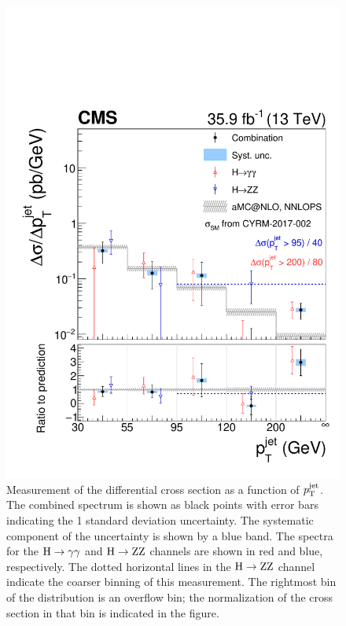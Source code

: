 \begin{figure}[hbtp]
  \begin{center}
    \includegraphics[width=0.49\linewidth]{img/differentials/spectra_ptjet.pdf}
    \caption{
        Measurement of the differential cross section as a function of $p_\mathrm{T}^\text{jet} $. The combined spectrum is shown as black points with error bars indicating the 1 standard deviation uncertainty. The systematic component of the uncertainty is shown by a blue band. The spectra for the $\mathrm{H}\to\mathrm{\gamma}\mathrm{\gamma}$ and $\mathrm{H}\to\mathrm{Z}\mathrm{Z}$ channels are shown in red and blue, respectively.
        The dotted horizontal lines in the $\mathrm{H}\to\mathrm{Z}\mathrm{Z}$ channel indicate the coarser binning of this measurement.
        The rightmost bin of the distribution is an overflow bin; the normalization of the cross section in that bin is indicated in the figure.
        }
    \label{fig:CombinedSpectra_ptjet}
  \end{center}
\end{figure}
